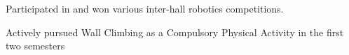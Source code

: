 

\begin{cventries}
  \cventry
    {} %
    {} %
    {} %
    {   
    } %
    {
    \vspace{-1.5em}
      \begin{cvitems} %
        \item {Participated in and won various inter-hall robotics competitions.}
        \item {Actively pursued Wall Climbing as a Compulsory Physical Activity in the first two semesters}
      \end{cvitems}
    }




\end{cventries}
